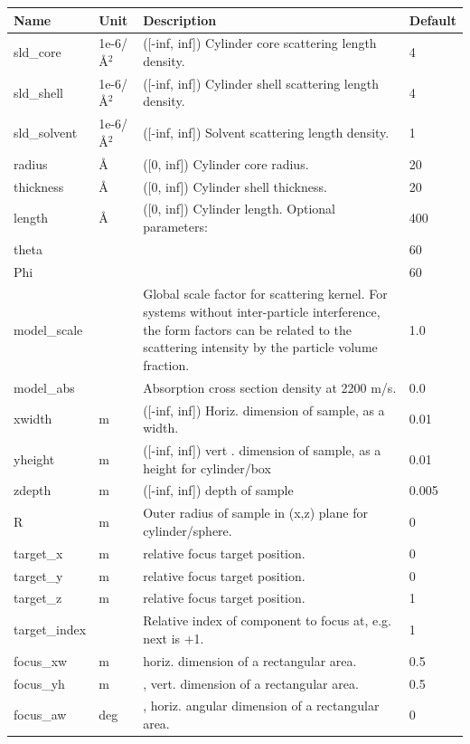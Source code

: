 \begin{longtable}{p{}p{}p{}p{}}
\toprule
\textbf{Name} & \textbf{Unit} & \textbf{Description} & \textbf{Default} \\
\midrule
\endhead
sld\_core & 1e-6/\AA{}$^{2}$ & ([-inf, inf]) Cylinder core scattering length density. & 4 \\
sld\_shell & 1e-6/\AA{}$^{2}$ & ([-inf, inf]) Cylinder shell scattering length density. & 4 \\
sld\_solvent & 1e-6/\AA{}$^{2}$ & ([-inf, inf]) Solvent scattering length density. & 1 \\
radius & \AA{} & ([0, inf]) Cylinder core radius. & 20 \\
thickness & \AA{} & ([0, inf]) Cylinder shell thickness. & 20 \\
length & \AA{} & ([0, inf]) Cylinder length. Optional parameters: & 400 \\
theta &  &  & 60 \\
Phi &  &  & 60 \\
model\_scale &   & Global scale factor for scattering kernel. For systems without inter-particle interference, the form factors can be related to the scattering intensity by the particle volume fraction. & 1.0 \\
model\_abs &   & Absorption cross section density at 2200 m/s. & 0.0 \\
xwidth & m & ([-inf, inf]) Horiz. dimension of sample, as a width. & 0.01 \\
yheight & m & ([-inf, inf]) vert . dimension of sample, as a height for cylinder/box & 0.01 \\
zdepth & m & ([-inf, inf]) depth of sample & 0.005 \\
R & m & Outer radius of sample in (x,z) plane for cylinder/sphere. & 0 \\
target\_x & m & relative focus target position. & 0 \\
target\_y & m & relative focus target position. & 0 \\
target\_z & m & relative focus target position. & 1 \\
target\_index &   & Relative index of component to focus at, e.g. next is +1. & 1 \\
focus\_xw & m & horiz. dimension of a rectangular area. & 0.5 \\
focus\_yh & m & , vert. dimension of a rectangular area. & 0.5 \\
focus\_aw & deg & , horiz. angular dimension of a rectangular area. & 0 \\

\end{longtable}
